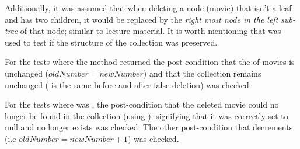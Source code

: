 \documentclass[a4paper]{article}
\begin{document}
Additionally, it was assumed that when deleting a node (movie) that isn't a leaf and has two children, it would be replaced by the \textit{right most node in the left sub-tree} of that node; similar to lecture material. It is worth mentioning that  was used to test if the structure of the collection was preserved.
\vspace{2mm}


\noindent
For the tests where the method returned  the post-condition that the  of movies is unchanged ($oldNumber = newNumber$) and that the collection remains unchanged ( is the same before and after false deletion) was checked.
\vspace{1.5mm}

For the tests where  was , the post-condition that the deleted movie could no longer be found in the collection (using ); signifying that it was correctly set to null and no longer exists was checked. The other post-condition that  decrements (i.e $oldNumber=newNumber+1$) was checked.
\end{document}
